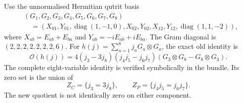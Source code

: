 \documentclass[11pt,a4paper]{article}
\numberwithin{equation}{section}
\theoremstyle{definition}\newtheorem{definition}[theorem]{Definition}
\theoremstyle{remark}\newtheorem{remark}[theorem]{Remark}
\DeclareMathOperator{\diag}{diag}\DeclareMathOperator{\Disc}{Disc}
\newcommand{\Ob}{\mathcal O}\newcommand{\tens}{\otimes}
\begin{document}
Use the unnormalised Hermitian qutrit basis
\begin{align}\label{eq:G}
 &(G_1,G_2,G_3,G_4,G_5,G_6,G_7,G_8)\\[-2mm]
 &\quad=(X_{01},Y_{01},\diag(1,-1,0),X_{02},Y_{02},X_{12},Y_{12},\diag(1,1,-2)),\nonumber
\end{align}
where $X_{ab}=E_{ab}+E_{ba}$ and $Y_{ab}=-iE_{ab}+iE_{ba}$. The Gram diagonal is $(2,2,2,2,2,2,2,6)$. For
$h(j)=\sum_{a=1}^8 j_aG_a\tens G_a$, the exact old identity is
\begin{equation}\label{eq:diaggap}
 \Ob(h(j))=4(j_3-3j_8)(j_4j_5-j_6j_7)
       (G_3\tens G_8-G_8\tens G_3).
\end{equation}
The complete eight-variable identity is verified symbolically in the bundle. Its zero set is the union of
\[
 Z_C=\{j_3=3j_8\},\qquad Z_P=\{j_4j_5=j_6j_7\}.
\]
The new quotient is not identically zero on either component.
\end{document}
